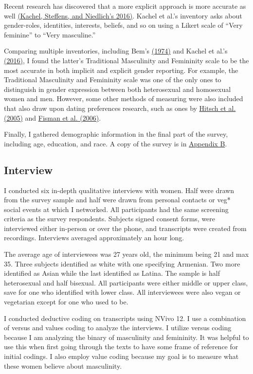 \documentclass[twoside]{report}
\begin{document}
Recent research has discovered that a more explicit approach is more accurate as well \hyperlink{kachel}{(Kachel, Steffens, and Niedlich's 2016)}. Kachel et al.'s inventory asks about gender-roles, identities, interests, beliefs, and so on using a Likert scale of ``Very feminine'' to ``Very masculine.''

Comparing multiple inventories, including Bem's \hyperlink{bem}{(1974)} and Kachel et al.'s \hyperlink{kachel}{(2016)}, I found the latter's Traditional Masculinity and Femininity scale to be the most accurate in
both implicit and explicit gender reporting. For example, the Traditional Masculinity and Femininity scale was one of the only ones to distinguish in gender expression between both heterosexual and homosexual women and men. However, some other methods of measuring were also included that also draw upon dating preferences research, such as ones by \hyperlink{hitsch1}{Hitsch et al. (2005)} and \hyperlink{fisman}{Fisman et al. (2006)}.

Finally, I gathered demographic information in the final part of the survey, including age, education, and race. A copy of the survey is in  \hyperlink{appendix-b}{Appendix B}.

\subsection{Interview}

I conducted six in-depth qualitative interviews with women. Half were drawn from the survey sample and half were drawn from personal contacts or veg* social events at which I networked. All participants had the same screening criteria as the survey respondents. Subjects signed consent forms, were interviewed either in-person or over the phone, and transcripts were created from recordings. Interviews averaged approximately an hour long.

The average age of interviewees was 27 years old, the minimum being 21 and max 35. Three subjects identified as white with one specifying Armenian. Two more identified as Asian while the last identified as Latina. The sample is half heterosexual and half bisexual. All participants were either middle or upper class, save for one who identified with lower class. All interviewees were also vegan or vegetarian except for one who used to be.

I conducted deductive coding on transcripts using NVivo 12. I use a combination of versus and values coding to analyze the interviews. I utilize versus coding because I am analyzing the binary of masculinity and femininity. It was helpful to use this when first going through the texts to have some frame of reference for initial codings. I also employ value coding because my goal is to measure what these women believe about masculinity.
\end{document}
